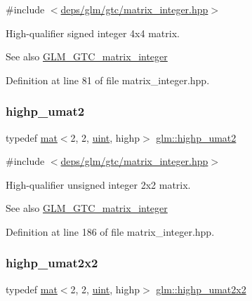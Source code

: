 {\ttfamily \#include $<$\hyperlink{matrix__integer_8hpp}{deps/glm/gtc/matrix\+\_\+integer.\+hpp}$>$}

High-\/qualifier signed integer 4x4 matrix. \begin{DoxySeeAlso}{See also}
\hyperlink{group__gtc__matrix__integer}{G\+L\+M\+\_\+\+G\+T\+C\+\_\+matrix\+\_\+integer} 
\end{DoxySeeAlso}


Definition at line 81 of file matrix\+\_\+integer.\+hpp.

\mbox{\label{group__gtc__matrix__integer_ga0788642172aac0bb6c4c16750c92ed96}} 
\subsubsection{\texorpdfstring{highp\+\_\+umat2}{highp\_umat2}}
{\footnotesize\ttfamily typedef \hyperlink{structglm_1_1mat}{mat}$<$2, 2, \hyperlink{group__core__precision_ga4fd29415871152bfb5abd588334147c8}{uint}, highp$>$ \hyperlink{group__gtc__matrix__integer_ga0788642172aac0bb6c4c16750c92ed96}{glm\+::highp\+\_\+umat2}}



{\ttfamily \#include $<$\hyperlink{matrix__integer_8hpp}{deps/glm/gtc/matrix\+\_\+integer.\+hpp}$>$}

High-\/qualifier unsigned integer 2x2 matrix. \begin{DoxySeeAlso}{See also}
\hyperlink{group__gtc__matrix__integer}{G\+L\+M\+\_\+\+G\+T\+C\+\_\+matrix\+\_\+integer} 
\end{DoxySeeAlso}


Definition at line 186 of file matrix\+\_\+integer.\+hpp.

\mbox{\label{group__gtc__matrix__integer_ga21045c3ef9df4966779713fa1a7b4b52}} 
\subsubsection{\texorpdfstring{highp\+\_\+umat2x2}{highp\_umat2x2}}
{\footnotesize\ttfamily typedef \hyperlink{structglm_1_1mat}{mat}$<$2, 2, \hyperlink{group__core__precision_ga4fd29415871152bfb5abd588334147c8}{uint}, highp$>$ \hyperlink{group__gtc__matrix__integer_ga21045c3ef9df4966779713fa1a7b4b52}{glm\+::highp\+\_\+umat2x2}}



